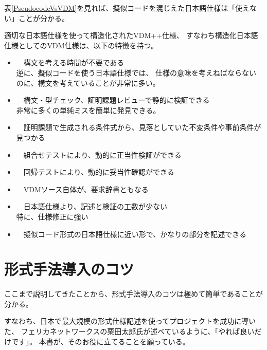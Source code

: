 	表\ref{PseudocodeVsVDM}を見れば、擬似コードを混じえた日本語仕様は「使えない」ことが分かる。

	適切な日本語仕様を使って構造化されたVDM++仕様、
	すなわち構造化日本語仕様としてのVDM仕様は、以下の特徴を持つ。

	\begin{itemize}
	\item　構文を考える時間が不要である \\
		逆に、擬似コードを使う日本語仕様では、
		仕様の意味を考えねばならないのに、構文を考えていることが非常に多い。
	\item　構文・型チェック、証明課題レビューで静的に検証できる \\
		非常に多くの単純ミスを簡単に発見できる。
	\item　証明課題で生成される条件式から、見落としていた不変条件や事前条件が見つかる
	\item　組合せテストにより、動的に正当性検証ができる
	\item　回帰テストにより、動的に妥当性確認ができる
	\item　VDMソース自体が、要求辞書ともなる
	\item　日本語仕様より、記述と検証の工数が少ない \\
		特に、仕様修正に強い
	\item　擬似コード形式の日本語仕様に近い形で、かなりの部分を記述できる
	\end{itemize} 

\section{形式手法導入のコツ}
	\label{How2UseFM}

	ここまで説明してきたことから、形式手法導入のコツは極めて簡単であることが分かる。

	すなわち、日本で最大規模の形式仕様記述を使ってプロジェクトを成功に導いた、
	フェリカネットワークスの栗田太郎氏が述べているように、「やれば良いだけです」。
	本書が、そのお役に立てることを願っている。